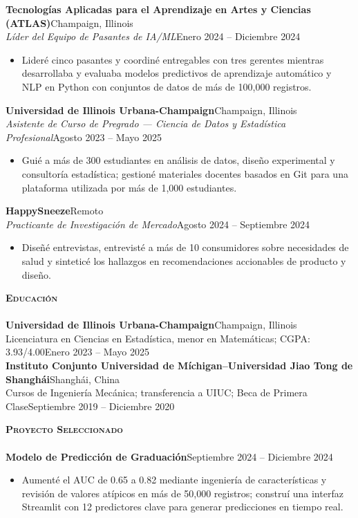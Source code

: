 \documentclass[a4paper]{article}
\newcommand{\lineunder}{
    \vspace*{-8pt} \\
    \hspace*{-18pt} \hrulefill \\
}
\newcommand{\header}[1]{
    \Needspace{4\baselineskip}
    {\hspace*{-18pt}\vspace*{5pt} \textsc{#1}}
    \vspace*{-6pt} \lineunder
}
\newcommand{\role}[4]{
    \Needspace{7\baselineskip}
    \vspace{2pt}
    \textbf{#1}\hfill #2\\
    \textit{#3}\hfill #4\\[-3pt]
}
\begin{document}
\role{Tecnologías Aplicadas para el Aprendizaje en Artes y Ciencias (ATLAS)}{Champaign, Illinois}
{Líder del Equipo de Pasantes de IA/ML}{Enero 2024 -- Diciembre 2024}
\begin{itemize}[noitemsep]
    \item Lideré cinco pasantes y coordiné entregables con tres gerentes mientras desarrollaba y evaluaba modelos predictivos de aprendizaje automático y NLP en Python con conjuntos de datos de más de 100,000 registros.
\end{itemize}

\role{Universidad de Illinois Urbana-Champaign}{Champaign, Illinois}
{Asistente de Curso de Pregrado --- Ciencia de Datos y Estadística Profesional}{Agosto 2023 -- Mayo 2025}
\begin{itemize}[noitemsep]
    \item Guié a más de 300 estudiantes en análisis de datos, diseño experimental y consultoría estadística; gestioné materiales docentes basados en Git para una plataforma utilizada por más de 1,000 estudiantes.
\end{itemize}

\role{HappySneeze}{Remoto}
{Practicante de Investigación de Mercado}{Agosto 2024 -- Septiembre 2024}
\begin{itemize}[noitemsep]
    \item Diseñé entrevistas, entrevisté a más de 10 consumidores sobre necesidades de salud y sinteticé los hallazgos en recomendaciones accionables de producto y diseño.
\end{itemize}

\vspace*{1mm}
\header{\textbf{Educación}}
\textbf{Universidad de Illinois Urbana-Champaign}\hfill Champaign, Illinois\\
Licenciatura en Ciencias en Estadística, menor en Matemáticas; CGPA: 3.93/4.00\hfill Enero 2023 -- Mayo 2025\\[-1pt]
\textbf{Instituto Conjunto Universidad de Míchigan--Universidad Jiao Tong de Shanghái}\hfill Shanghái, China\\
Cursos de Ingeniería Mecánica; transferencia a UIUC; Beca de Primera Clase\hfill Septiembre 2019 -- Diciembre 2020\\[-1pt]

\vspace*{1mm}
\header{\textbf{Proyecto Seleccionado}}
\textbf{Modelo de Predicción de Graduación}\hfill Septiembre 2024 -- Diciembre 2024
\begin{itemize}[noitemsep]
    \item Aumenté el AUC de 0.65 a 0.82 mediante ingeniería de características y revisión de valores atípicos en más de 50,000 registros; construí una interfaz Streamlit con 12 predictores clave para generar predicciones en tiempo real.
\end{itemize}
\end{document}
